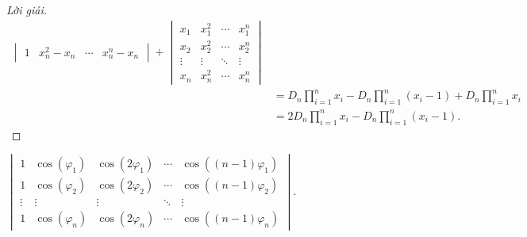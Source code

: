 \documentclass[class=linear-algebra,crop=false]{standalone}
\begin{document}
\begin{proof}[Lời giải]
\begin{align*}
\begin{vmatrix}
			1      & x_{n}^{2} - x_{n} & \cdots & x_{n}^{n} - x_{n}
		\end{vmatrix}
		+
		\begin{vmatrix}
			x_{1}  & x_{1}^{2} & \cdots & x_{1}^{n} \\
			x_{2}  & x_{2}^{2} & \cdots & x_{2}^{n} \\
			\vdots & \vdots    & \ddots & \vdots    \\
			x_{n}  & x_{n}^{2} & \cdots & x_{n}^{n}
		\end{vmatrix}                                                      \\
		 & = D_{n}\prod^{n}_{i=1}x_{i} - D_{n}\prod^{n}_{i=1}(x_{i} - 1) + D_{n}\prod^{n}_{i=1}x_{i} \\
		 & = 2D_{n}\prod^{n}_{i=1}x_{i} - D_{n}\prod^{n}_{i=1}(x_{i} - 1).
	\end{align*}
	\endgroup{}
\end{proof}

\begin{exercise}
	$\begin{vmatrix}
			1      & \cos(\varphi_{1}) & \cos(2\varphi_{1}) & \cdots & \cos((n-1)\varphi_{1}) \\
			1      & \cos(\varphi_{2}) & \cos(2\varphi_{2}) & \cdots & \cos((n-1)\varphi_{2}) \\
			\vdots & \vdots            & \vdots             & \ddots & \vdots                 \\
			1      & \cos(\varphi_{n}) & \cos(2\varphi_{n}) & \cdots & \cos((n-1)\varphi_{n})
		\end{vmatrix}$.
\end{exercise}
\end{document}
